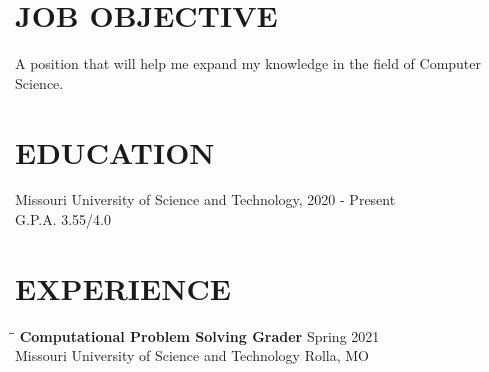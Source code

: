 \documentclass{res}
\begin{document}
 


\address{\bf  ADDRESS\\1310 N Pine Street\\Rolla, MO 654501\\(636) 730-8032}
\address{\bf \textcolor{blue}{\underline{\href{https://github.com/Skrublaub/resume}{LINK TO THIS RESUME}}}}
                                  
\begin{resume}

\section{JOB OBJECTIVE}          
    A position that will help me expand my knowledge in the field
    of Computer Science.
 
\section{EDUCATION}          
    Missouri University of Science and Technology, 2020 - Present\\        
    G.P.A. 3.55/4.0          

 
\section{EXPERIENCE}
   \vspace{-0.1in}	
   \begin{tabbing}
   \hspace{2.3in}\= \hspace{2.6in}\= \kill %
    {\bf Computational Problem Solving Grader} \>  \>Spring 2021\\
    		Missouri University of Science and Technology\>\> Rolla, MO\\
                             

\end{tabbing}
\end{resume}
\end{document}
